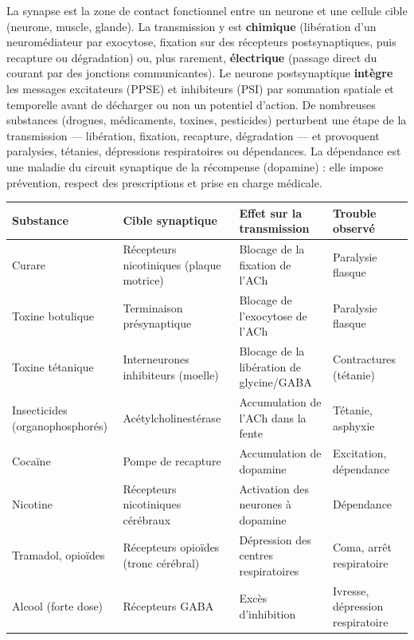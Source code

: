 \documentclass[11pt]{article}
\begin{document}
\begin{aretenir}
La synapse est la zone de contact fonctionnel entre un neurone et une cellule cible (neurone, muscle, glande). La transmission y est \textbf{chimique} (libération d'un neuromédiateur par exocytose, fixation sur des récepteurs postsynaptiques, puis recapture ou dégradation) ou, plus rarement, \textbf{électrique} (passage direct du courant par des jonctions communicantes). Le neurone postsynaptique \textbf{intègre} les messages excitateurs (PPSE) et inhibiteurs (PSI) par sommation spatiale et temporelle avant de décharger ou non un potentiel d'action. De nombreuses substances (drogues, médicaments, toxines, pesticides) perturbent une étape de la transmission — libération, fixation, recapture, dégradation — et provoquent paralysies, tétanies, dépressions respiratoires ou dépendances. La dépendance est une maladie du circuit synaptique de la récompense (dopamine) : elle impose prévention, respect des prescriptions et prise en charge médicale.
\end{aretenir}

\begin{center}
\begin{tabularx}{\linewidth}{|l|X|X|X|}
\hline
\rowcolor{poporangeL} \textbf{Substance} & \textbf{Cible synaptique} & \textbf{Effet sur la transmission} & \textbf{Trouble observé} \\
\hline
Curare & Récepteurs nicotiniques (plaque motrice) & Blocage de la fixation de l'ACh & Paralysie flasque \\
\hline
Toxine botulique & Terminaison présynaptique & Blocage de l'exocytose de l'ACh & Paralysie flasque \\
\hline
Toxine tétanique & Interneurones inhibiteurs (moelle) & Blocage de la libération de glycine/GABA & Contractures (tétanie) \\
\hline
Insecticides (organophosphorés) & Acétylcholinestérase & Accumulation de l'ACh dans la fente & Tétanie, asphyxie \\
\hline
Cocaïne & Pompe de recapture & Accumulation de dopamine & Excitation, dépendance \\
\hline
Nicotine & Récepteurs nicotiniques cérébraux & Activation des neurones à dopamine & Dépendance \\
\hline
Tramadol, opioïdes & Récepteurs opioïdes (tronc cérébral) & Dépression des centres respiratoires & Coma, arrêt respiratoire \\
\hline
Alcool (forte dose) & Récepteurs GABA & Excès d'inhibition & Ivresse, dépression respiratoire \\
\hline
\end{tabularx}
\end{center}
\end{document}
